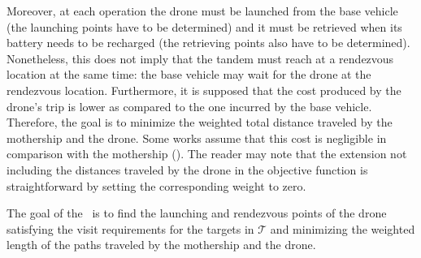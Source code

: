 
\noindent

% 


Moreover, at each operation the drone must be launched from the base vehicle (the launching points have to be determined) and it must be retrieved when its battery needs to be recharged (the retrieving points also have to be determined). Nonetheless, this does not imply that the tandem must reach at a rendezvous location at the same time: the base vehicle may wait for the drone at the rendezvous location. Furthermore, it is supposed that the cost produced by the drone's trip is lower as compared to the one incurred by the base vehicle. Therefore, the goal is to minimize the weighted total distance traveled by the mothership and the drone. Some works assume that this cost is negligible in comparison with the mothership (\cite{art:Amorosi2021}). The reader may note that the extension not including the distances traveled by the drone in the objective function is straightforward by setting the corresponding weight to zero.
\noindent

The goal of the \AMD \ is to find the launching and rendezvous points of the drone satisfying the visit requirements for the targets in $\mathcal T$ and minimizing the weighted length of the paths traveled by the mothership and the drone. \\

\noindent

